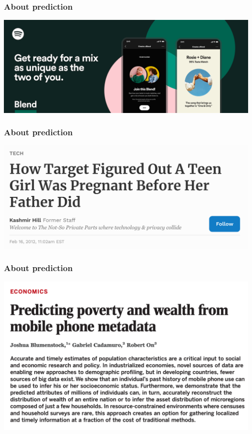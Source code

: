 \documentclass[aspectratio=43]{beamer}
\begin{document}
\begin{frame}
\frametitle{About prediction}
\centering

\includegraphics[width = \textwidth]{../img/spotify}

\end{frame}

\begin{frame}
\frametitle{About prediction}
\centering

\includegraphics[width = \textwidth]{../img/target_pregnancy}

\end{frame}

\begin{frame}
\frametitle{About prediction}
\centering

\includegraphics[width = \textwidth]{../img/blumenstock}

\end{frame}
\end{document}

